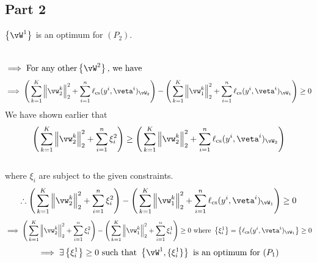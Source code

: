 \documentclass[a4paper,11pt]{article}
\begin{document}
\begin{mlsolution}
\subsection*{Part 2}
$\bc{\vW^1}$ is an optimum for $(P_2)$. 

\\ $\implies \text{For any other} \bc{\vW^2} \text{, we have }$
\[ \implies \Bigg(\sum_{k=1}^K\norm{\vw^k_2}_2^2 + \sum_{i=1}^n\ell_\text{cs}(y^i,\veta^i)_{\vW_2} \Bigg) - \Bigg(\sum_{k=1}^K\norm{\vw^k_1}_2^2 + \sum_{i=1}^n\ell_\text{cs}(y^i,\veta^i)_{\vW_1} \Bigg) \geq 0\]
We have shown earlier that
\[ \Bigg(\sum_{k=1}^K\norm{\vw^k_2}_2^2 + \sum_{i=1}^n\xi^2_i\Bigg) \geq \Bigg(\sum_{k=1}^K\norm{\vw^k_2}_2^2 + \sum_{i=1}^n\ell_\text{cs}(y^i,\veta^i)_{\vW_2} \Bigg) \text{} \]
\\where $\xi_i$ are subject to the given constraints.
\[\therefore \Bigg(\sum_{k=1}^K\norm{\vw^k_2}_2^2 + \sum_{i=1}^n\xi^2_i\Bigg) - \Bigg(\sum_{k=1}^K\norm{\vw^k_1}_2^2 + \sum_{i=1}^n\ell_\text{cs}(y^i,\veta^i)_{\vW_1} \Bigg) \geq 0  \]
\[\implies \Bigg(\sum_{k=1}^K\norm{\vw^k_2}_2^2 + \sum_{i=1}^n\xi^2_i\Bigg) - \Bigg(\sum_{k=1}^K\norm{\vw^k_1}_2^2 + \sum_{i=1}^n\xi^1_i \Bigg) \geq 0 \text{ where } \bc{\xi^1_i} = \bc{\ell_\text{cs}(y^i,\veta^i)_{\vW_1}} \geq 0  \]
\[\implies \exists \bc{\xi^1_i} \geq 0 \text{ such that } \bc{\vW^1, \{\xi^1_i\}} \text{ is an optimum for } (P_1) \]
\end{mlsolution}
\end{document}
